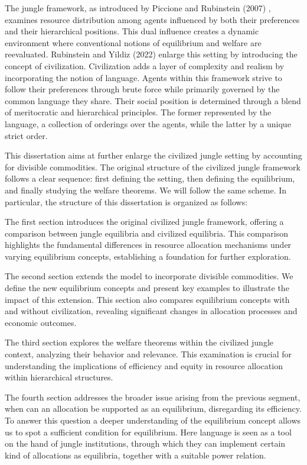 \documentclass[12pt,a4paper]{article}
\numberwithin{theorem}{section}
\numberwithin{definition}{section}
\numberwithin{example}{section}
\numberwithin{exercise}{section}
\begin{document}
The jungle framework, as introduced by Piccione and Rubinstein (2007) \cite[PR]{P-R}, examines resource distribution among agents influenced by both their preferences and their hierarchical positions. This dual influence creates a dynamic environment where conventional notions of equilibrium and welfare are reevaluated. Rubinstein and Yildiz (2022) \cite[RY]{RY} enlarge this setting by introducing the concept of civilization. Civilization adds a layer of complexity and realism by incorporating the notion of language. Agents within this framework strive to follow their preferences through brute force while primarily governed by the common language they share. Their social position is determined through a blend of meritocratic and hierarchical principles. The former represented by the language, a collection of orderings over the agents, while the latter by a unique strict order.

This dissertation aims at further enlarge the civilized jungle setting by accounting for divisible commodities. The original structure of the civilized jungle framework follows a clear sequence: first defining the setting, then defining the equilibrium, and finally studying the welfare theorems. We will follow the same scheme. In particular, the structure of this dissertation is organized as follows:

The first section introduces the original civilized jungle framework, offering a comparison between jungle equilibria and civilized equilibria. This comparison highlights the fundamental differences in resource allocation mechanisms under varying equilibrium concepts, establishing a foundation for further exploration.

The second section extends the model to incorporate divisible commodities. We define the new equilibrium concepts and present key examples to illustrate the impact of this extension. This section also compares equilibrium concepts with and without civilization, revealing significant changes in allocation processes and economic outcomes.

The third section explores the welfare theorems within the civilized jungle context, analyzing their behavior and relevance. This examination is crucial for understanding the implications of efficiency and equity in resource allocation within hierarchical structures.

The fourth section addresses the broader issue arising from the previous segment, when can an allocation be supported as an equilibrium, disregarding its efficiency. To answer this question a deeper understanding of the equilibrium concept allows us to spot a sufficient condition for equilibrium. Here language is seen as a tool on the hand of jungle institutions, through which they can implement certain kind of allocations as equilibria, together with a suitable power relation.     
\end{document}
